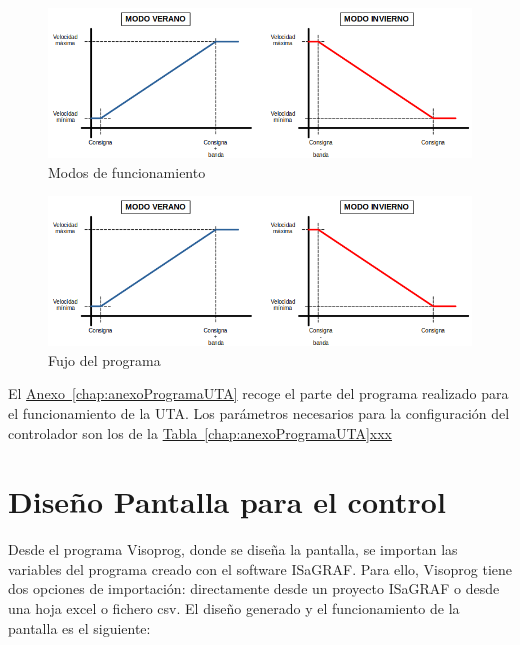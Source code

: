 \begin{figure}[H]
  \centering
  \includegraphics[width=\textwidth, keepaspectratio]{img/curvaModos}
  \caption{Modos de funcionamiento}
  \label{figura:curvasModos}
\end{figure}

\begin{figure}[H]
  \centering
  \includegraphics[width=\textwidth, keepaspectratio]{img/curvaModos}
  \caption{Fujo del programa}
  \label{figura:flujoPrograma}
\end{figure}

El \hyperref[chap:anexoProgramaUTA]{Anexo~\ref{chap:anexoProgramaUTA}} recoge el parte del programa realizado para el funcionamiento de la UTA. Los parámetros necesarios para la configuración del controlador son los de la \hyperref[chap:anexoProgramaUTA]{Tabla~\ref{chap:anexoProgramaUTA}xxx}


\section{Diseño Pantalla para el control}
\label{sec:programacionpantalla}
Desde el programa Visoprog, donde se diseña la pantalla, se importan las variables del programa creado con el software ISaGRAF. Para ello, Visoprog tiene dos opciones de importación: directamente desde un proyecto ISaGRAF o desde una hoja excel o fichero csv. El diseño generado y el funcionamiento de la pantalla es el siguiente:


